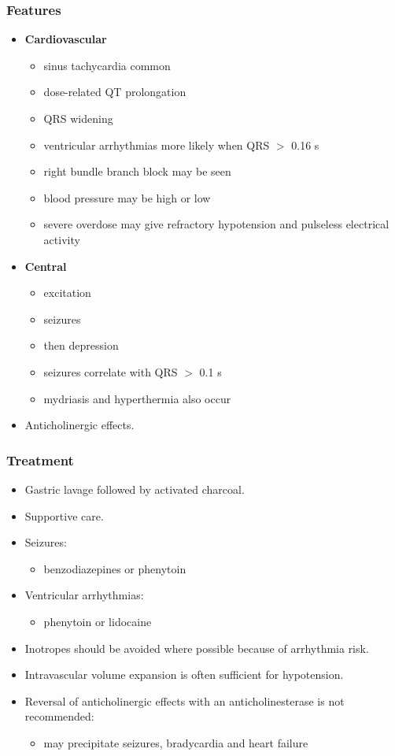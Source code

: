 \documentclass[11pt,a4paper]{article}
\begin{document}
\subsubsection{Features}
\begin{itemize}
  \item \textbf{Cardiovascular}
  \begin{itemize}
    \item sinus tachycardia common
    \item dose-related QT prolongation
    \item QRS widening
    \item ventricular arrhythmias more likely when QRS $>$ 0.16 s
    \item right bundle branch block may be seen
    \item blood pressure may be high or low
    \item severe overdose may give refractory hypotension and pulseless electrical activity
  \end{itemize}
  \item \textbf{Central}
  \begin{itemize}
    \item excitation
    \item seizures
    \item then depression
    \item seizures correlate with QRS $>$ 0.1 s
    \item mydriasis and hyperthermia also occur
  \end{itemize}
  \item Anticholinergic effects.
\end{itemize}

\subsubsection{Treatment}
\begin{itemize}
  \item Gastric lavage followed by activated charcoal.
  \item Supportive care.
  \item Seizures:
  \begin{itemize}
    \item benzodiazepines or phenytoin
  \end{itemize}
  \item Ventricular arrhythmias:
  \begin{itemize}
    \item phenytoin or lidocaine
  \end{itemize}
  \item Inotropes should be avoided where possible because of arrhythmia risk.
  \item Intravascular volume expansion is often sufficient for hypotension.
  \item Reversal of anticholinergic effects with an anticholinesterase is not recommended:
  \begin{itemize}
    \item may precipitate seizures, bradycardia and heart failure
  \end{itemize}
\end{itemize}
\end{document}
